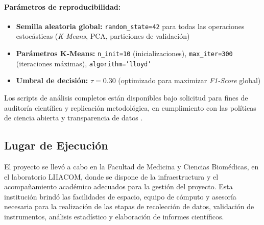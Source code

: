 \paragraph{Parámetros de reproducibilidad:}
\begin{itemize}
    \item \textbf{Semilla aleatoria global:} \texttt{random\_state=42} para todas las operaciones estocásticas (\textit{K-Means}, PCA, particiones de validación)
    \item \textbf{Parámetros K-Means:} \texttt{n\_init=10} (inicializaciones), \texttt{max\_iter=300} (iteraciones máximas), \texttt{algorithm='lloyd'}
    \item \textbf{Umbral de decisión:} $\tau=0.30$ (optimizado para maximizar \textit{F1-Score} global)
\end{itemize}

Los scripts de análisis completos están disponibles bajo solicitud para fines de auditoría científica y replicación metodológica, en cumplimiento con las políticas de ciencia abierta y transparencia de datos \cite{Wilkinson2016FAIR}.

\subsection{Lugar de Ejecución}

El proyecto se llevó a cabo en la Facultad de Medicina y Ciencias Biomédicas, en el laboratorio LIIACOM, donde se dispone de la infraestructura y el acompañamiento académico adecuados para la gestión del proyecto. Esta institución brindó las facilidades de espacio, equipo de cómputo y asesoría necesaria para la realización de las etapas de recolección de datos, validación de instrumentos, análisis estadístico y elaboración de informes científicos.
